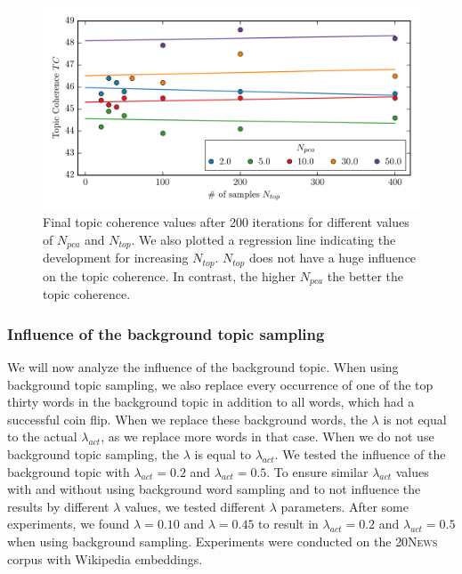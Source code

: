 \documentclass[
        a4paper,
        titlepage,
        twoside,
        parskip
        ]{scrbook}
\theoremstyle{break}
\begin{document}
\begin{figure}
       \centering
       \includegraphics[width=\textwidth]{figures/welda_gaussian_pca_samples.png}
       \caption{Final topic coherence values after 200 iterations for different values of $N_{pca}$ and $N_{top}$. We also plotted a regression line indicating the development for increasing $N_{top}$. $N_{top}$ does not have a huge influence on the topic coherence. In contrast, the higher $N_{pca}$ the better the topic coherence.}
       \label{fig:welda_gaussian_pca_samples}
\end{figure}


\subsubsection{Influence of the background topic sampling}

We will now analyze the influence of the background topic.
When using background topic sampling, we also replace every occurrence of one of the top thirty words in the background topic in addition to all words, which had a successful coin flip.
When we replace these background words, the $\lambda$ is not equal to the actual $\lambda_{act}$, as we replace more words in that case.
When we do not use background topic sampling, the $\lambda$ is equal to $\lambda_{act}$.
We tested the influence of the background topic with $\lambda_{act} = 0.2$ and $\lambda_{act} = 0.5$.
To ensure similar $\lambda_{act}$ values with and without using background word sampling and to not influence the results by different $\lambda$ values, we tested different $\lambda$ parameters.
After some experiments, we found $\lambda = 0.10$ and $\lambda = 0.45$ to result in $\lambda_{act} = 0.2$ and $\lambda_{act} = 0.5$ when using background sampling.
Experiments were conducted on the \textsc{20News} corpus with Wikipedia embeddings.
\end{document}
